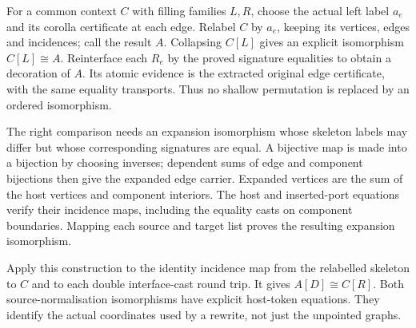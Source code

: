 
For a common context $C$ with filling families $L,R$, choose the actual
left label $a_e$ and its corolla certificate at each edge. Relabel $C$ by
$a_e$, keeping its vertices, edges and incidences; call the result $A$.
Collapsing $C[L]$ gives an explicit isomorphism $C[L]\cong A$.
Reinterface each $R_e$ by the proved signature equalities to obtain a
decoration of $A$. Its atomic evidence is the extracted original edge
certificate, with the same equality transports. Thus no shallow permutation
is replaced by an ordered isomorphism.


The right comparison needs an expansion isomorphism whose skeleton labels
may differ but whose corresponding signatures are equal. A bijective map
is made into a bijection by choosing inverses; dependent sums of edge and
component bijections then give the expanded edge carrier. Expanded vertices
are the sum of the host vertices and component interiors. The host and
inserted-port equations verify their incidence maps, including the equality
casts on component boundaries. Mapping each source and target list proves
the resulting expansion isomorphism.


Apply this construction to the identity incidence map from the relabelled
skeleton to $C$ and to each double interface-cast round trip. It gives
$A[D]\cong C[R]$. Both source-normalisation isomorphisms have explicit
host-token equations. They identify the actual coordinates used by a rewrite,
not just the unpointed graphs.

